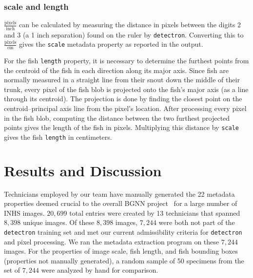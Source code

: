 \documentclass[conference]{IEEEtran}
\begin{document}
\subsubsection{scale and length}
\(\frac{\mathrm{pixels}}{\mathrm{inch}}\) can be calculated by measuring the distance in pixels between the digits 2 and 3 (a 1 inch separation) found on the ruler by \verb|detectron|. Converting this to \(\frac{\mathrm{pixels}}{\mathrm{cm}}\) gives the \verb|scale| metadata property as reported in the output.

For the fish \verb|length| property, it is necessary to determine the furthest points from the centroid of the fish in each direction along its major
axis. Since fish are normally measured in a straight line from their snout down the middle of their trunk, every pixel of the fish blob is projected
onto the fish's major axis (as a line through its centroid).
The projection is done by finding the closest point on the
centroid--principal axis line from the pixel's location.
After processing every pixel in the fish blob, computing the distance
between the two furthest projected points gives the length of the fish in pixels. Multiplying this distance by \verb|scale| gives the fish \verb|length| in centimeters.

\section{Results and Discussion}
Technicians employed by our team have manually generated the 22 metadata properties deemed crucial to the overall BGNN project~\cite{leipzig2021biodiversity} for a large number of INHS images. \(20,699\) total entries were created by 13 technicians that spanned \(8,398\) unique images. Of these \(8,398\) images, \(7,244\) were both not part of the \verb|detectron| training set and met our current admissibility criteria for \verb|detectron| and pixel processing. We ran the metadata extraction program on these \(7,244\) images.
For the properties of image scale, fish length, and fish bounding boxes
(properties not manually generated),
a random sample of 50 specimens from the set of \(7,244\) were analyzed by
hand for comparison.
\end{document}
